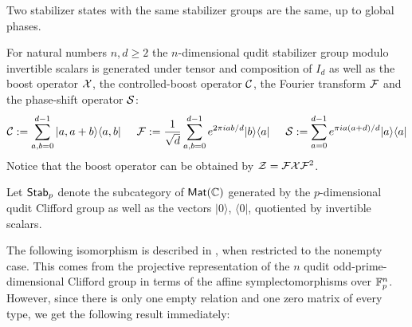\begin{lemma}
Two stabilizer states with the same stabilizer groups are the same, up to global phases.
\end{lemma}

\begin{lemma}
\label{lemma:end}
For natural numbers $n,d \geq 2$ the $n$-dimensional qudit stabilizer group modulo invertible scalars is generated under tensor and composition of $I_d$ as well as the boost operator ${\cal X}$, the controlled-boost operator  ${\cal C}$, the Fourier transform ${\cal F}$ and the phase-shift operator ${\cal S}$:
$$
{\cal C}  := \sum_{a,b = 0 }^{d-1} |a,a+b \rangle\langle a, b|
\hspace*{.5cm}
{\cal F}  := \frac{1}{\sqrt d}\sum_{a,b= 0 }^{d-1} e^{2\pi i ab/d} |b \rangle\langle a|
\hspace*{.5cm}
{\cal S} := \sum_{a =0}^{d-1} e^{\pi i a (a+d)/d} |  a  \rangle\langle a |
$$
Notice that the boost operator can be obtained by ${\cal Z }={\cal F}{\cal X} {\cal F}^{2}$.
\end{lemma}



\begin{definition}
Let ${\sf Stab}_p$ denote the subcategory of $\mathsf{Mat}(\mathbb{C})$ generated by the $p$-dimensional qudit Clifford group as well as the vectors $| 0\rangle$, $\langle 0|$, quotiented by invertible scalars.
\end{definition}


The following isomorphism is described in \cite{gross}, when restricted to the nonempty case.  This comes from the projective representation of the $n$ qudit odd-prime-dimensional Clifford group in terms of the affine symplectomorphisms over $\mathbb{F}_p^n$.  However, since there is only one empty relation and one zero matrix of every type, we get the following result immediately:

